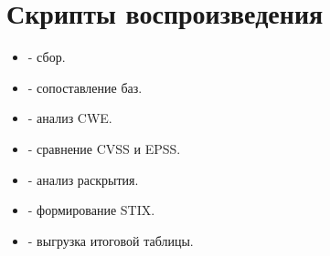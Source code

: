 \documentclass[12pt,a4paper]{report}
\begin{document}
\section*{Скрипты воспроизведения}
\begin{itemize}
\item \href{https://github.com/quiner1793/HSE-Cybersecurity-Programming-Work1/blob/master/scripts/1_collect_pytorch_vulns/__main__.py}{} - сбор.
\item \href{https://github.com/quiner1793/HSE-Cybersecurity-Programming-Work1/blob/master/scripts/2_compare_sources/__main__.py}{} - сопоставление баз.
\item \href{https://github.com/quiner1793/HSE-Cybersecurity-Programming-Work1/blob/master/scripts/3_analyze_cwe/__main__.py}{} - анализ CWE.
\item \href{https://github.com/quiner1793/HSE-Cybersecurity-Programming-Work1/blob/master/scripts/4_compare_cvss/__main__.py}{} - сравнение CVSS и EPSS.
\item \href{https://github.com/quiner1793/HSE-Cybersecurity-Programming-Work1/blob/master/scripts/5_analyze_disclosure/__main__.py}{} - анализ раскрытия.
\item \href{https://github.com/quiner1793/HSE-Cybersecurity-Programming-Work1/blob/master/scripts/6_build_stix/__main__.py}{} - формирование STIX.
\item \href{https://github.com/quiner1793/HSE-Cybersecurity-Programming-Work1/blob/master/scripts/7_export_final_table/__main__.py}{} - выгрузка итоговой таблицы.
\end{itemize}
\end{document}
